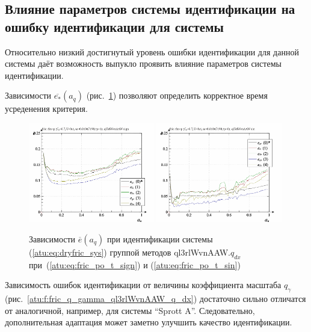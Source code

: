 



\subsection{Влияние параметров системы идентификации на ошибку идентификации для системы }  %

Относительно низкий достигнутый уровень ошибки идентификации
для данной системы даёт возможность выпукло проявить влияние
параметров системы идентификации.


Зависимости $\overline{e_*}(a_q)$ (рис.~\ref{atu:f:fric_a_q_ql3rlWvnAAW_q_dx})
 позволяют определить корректное время усреденения критерия.

\begin{figure}[htb!]
  \centerline{
    \includegraphics[width=0.49\textwidth]{p/cha/fric/ql3rlWvnAAW/fric_id-p_a_q_sign.png}
    \hfill
    \includegraphics[width=0.49\textwidth]{p/cha/fric/ql3rlWvnAAW/fric_id-p_a_q_sin.png}
  }
  \caption{Зависимости $\overline{e}(a_q)$ при идентификации системы (\ref{atu:eq:dryfric_sys}) группой методов ql3rlWvnAAW.$q_{dx}$
   при~(\ref{atu:eq:fric_po_t_sign}) и (\ref{atu:eq:fric_po_t_sin})}
  \label{atu:f:fric_a_q_ql3rlWvnAAW_q_dx}
\end{figure}


Зависимость ошибок идентификации от величины коэффициента масштаба
$q_\gamma$
(рис.~\ref{atu:f:fric_q_gamma_ql3rlWvnAAW_q_dx})
достаточно сильно отличатся от аналогичной, например, для системы ``Sprott A''.
Следовательно,
дополнительная адаптация может заметно улучшить качество идентификации.


